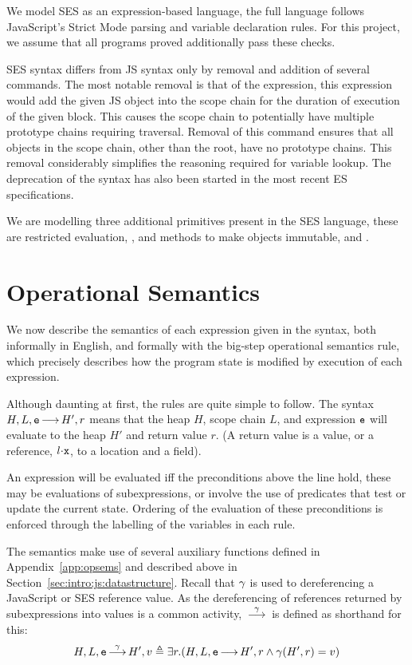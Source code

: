 \documentclass[a4paper,notitlepage]{report}
\begin{document}
  We model SES as an expression-based language, the full language follows
  JavaScript's Strict Mode parsing and variable declaration rules. For this
  project, we assume that all programs proved additionally pass these checks.

  SES syntax differs from JS syntax only by removal and addition of several
  commands. The most notable removal is that of the  expression, this
  expression would add the given JS object into the scope chain for the duration
  of execution of the given block. This causes the scope chain to potentially
  have multiple prototype chains requiring traversal. Removal of this command
  ensures that all objects in the scope chain, other than the root, have no
  prototype chains. This removal considerably simplifies the reasoning required
  for variable lookup. The deprecation of the  syntax has also been
  started in the most recent ES specifications.

  We are modelling three additional primitives present in the SES language,
  these are restricted evaluation, , and methods to make objects
  immutable,  and .

  \section{Operational Semantics}
  \label{sec:opsems}

  We now describe the semantics of each expression given in the syntax, both
  informally in English, and formally with the big-step operational semantics
  rule, which precisely describes how the program state is modified by execution
  of each expression.

  Although daunting at first, the rules are quite simple to follow. The syntax
  $H,L,\mathtt{e} {\,\longrightarrow\,} H',r$ means that the heap $H$, scope chain $L$, and
  expression $\mathtt{e}$ will evaluate to the heap $H'$ and return value $r$. (A
  return value is a value, or a reference, $\fld{l}{\js{x}}$, to a location and
  a field).

  An expression will be evaluated iff the preconditions above the line hold,
  these may be evaluations of subexpressions, or involve the use of predicates
  that test or update the current state.
  Ordering of the evaluation of these preconditions is enforced through the
  labelling of the variables in each rule.

  The semantics make use of several auxiliary functions defined in
  Appendix~\ref{app:opsems} and described above in
  Section~\ref{sec:intro:js:datastructure}. Recall that $\gamma$ is used to
  dereferencing a JavaScript or SES reference value.
  As the dereferencing of references returned by subexpressions into values is a
  common activity, $\overset{\gamma}{{\,\longrightarrow\,}}$ is defined as shorthand for this:
  \[ H,L,\mathtt{e} \overset{\gamma}{{\,\longrightarrow\,}} H',v \triangleq \exists r. (H,L,\mathtt{e} {\,\longrightarrow\,} H',r
  \wedge \gamma(H',r) = v) \]
\end{document}
